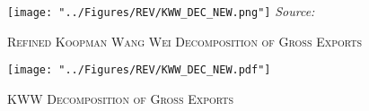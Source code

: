 \documentclass[a4paper]{article}
\begin{document}



\begin{figure}[h!] %
\centering
\caption{\label{fig:KWW}\textsc{Refined Koopman Wang Wei Decomposition of Gross Exports}}
\texttt{[image: "../Figures/REV/KWW\_DEC\_NEW.png"]} %
\raggedleft
\scriptsize
\emph{Source:} \citet{antras2022global}
\end{figure}
\FloatBarrier

\begin{figure}[h!]
\centering
\caption{\label{fig:KWW_fill_ts}\textsc{KWW Decomposition of Gross Exports}}
\texttt{[image: "../Figures/REV/KWW\_DEC\_NEW.pdf"]} %
\end{figure}
\FloatBarrier
\end{document}

